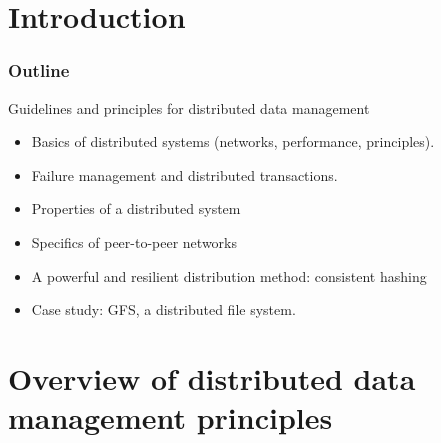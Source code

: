 \documentclass{beamer}
\begin{document}
\maketitle


%
%


\section{Introduction}


\begin{frame}
\frametitle{Outline}

\vfill

\alert{Guidelines and principles for distributed data management}

\begin{itemize}
  \item Basics of distributed systems (networks, performance, principles).
    \item Failure management and distributed transactions.  
     \item Properties of a distributed system
     \item Specifics of peer-to-peer networks
     \item A powerful and resilient distribution method: consistent hashing
     \item Case study: GFS, a distributed file system.
\end{itemize}

\end{frame}

\section{Overview of distributed data management principles}
\end{document}
